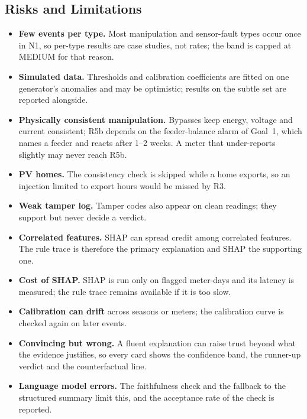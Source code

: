 \documentclass[11pt,a4paper]{article}
\begin{document}
\subsection{Risks and Limitations}
\label{sec:risks}
\begin{itemize}[leftmargin=*,itemsep=2pt]
  \item \textbf{Few events per type.} Most manipulation and sensor-fault types occur once in N1, so
        per-type results are case studies, not rates; the \SD{} band is capped at MEDIUM for that reason.
  \item \textbf{Simulated data.} Thresholds and calibration coefficients are fitted on one generator's
        anomalies and may be optimistic; results on the subtle set are reported alongside.
  \item \textbf{Physically consistent manipulation.} Bypasses keep energy, voltage and current consistent;
        R5b depends on the feeder-balance alarm of Goal~1, which names a feeder and reacts after 1--2 weeks. A
        meter that under-reports slightly may never reach R5b.
  \item \textbf{PV homes.} The consistency check is skipped while a home exports, so an injection limited to
        export hours would be missed by R3.
  \item \textbf{Weak tamper log.} Tamper codes also appear on clean readings; they support but never decide
        a verdict.
  \item \textbf{Correlated features.} SHAP can spread credit among correlated features. The rule trace is
        therefore the primary explanation and SHAP the supporting one.
  \item \textbf{Cost of SHAP.} SHAP is run only on flagged meter-days and its latency is measured; the rule
        trace remains available if it is too slow.
  \item \textbf{Calibration can drift} across seasons or meters; the calibration curve is checked again on
        later events.
  \item \textbf{Convincing but wrong.} A fluent explanation can raise trust beyond what the evidence
        justifies, so every card shows the confidence band, the runner-up verdict and the counterfactual line.
  \item \textbf{Language model errors.} The faithfulness check and the fallback to the structured summary
        limit this, and the acceptance rate of the check is reported.
\end{itemize}
\end{document}
